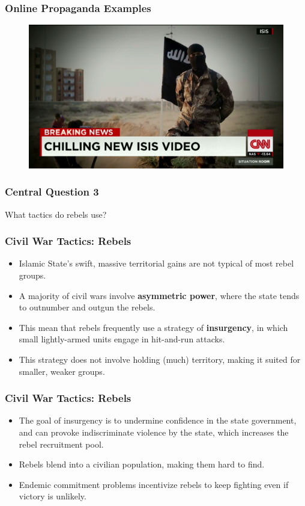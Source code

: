 \documentclass[handout]{beamer}
\begin{document}
\begin{frame} 
	\frametitle{\LARGE{Online Propaganda Examples}}
	\begin{figure}[ht!]
		\centering
		\includegraphics[width=\textwidth,height=0.9\textheight,keepaspectratio]{ISISprop2.jpg}
	\end{figure}
\end{frame}

\begin{frame} 
	\frametitle{\LARGE{Central Question 3}}
	\centering
	\Large{What tactics do rebels use?} 
\end{frame}

\begin{frame} 
	\frametitle{\LARGE{Civil War Tactics: Rebels}}
	\begin{itemize}
		\item Islamic State's swift, massive territorial gains are not typical of most rebel groups.
		\item A majority of civil wars involve \textbf{asymmetric power}, where the state tends to outnumber and outgun the rebels. \pause 
		\item This mean that rebels frequently use a strategy of \textbf{insurgency}, in which small lightly-armed units engage in hit-and-run attacks. \pause 
		\item This strategy does not involve holding (much) territory, making it suited for smaller, weaker groups.  
	\end{itemize}
\end{frame}

\begin{frame} 
	\frametitle{\LARGE{Civil War Tactics: Rebels}}
	\begin{itemize}
		\item The goal of insurgency is to undermine confidence in the state government, and can provoke indiscriminate violence by the state, which increases the rebel recruitment pool. \pause
		\item Rebels blend into a civilian population, making them hard to find. \pause
		\item Endemic commitment problems incentivize rebels to keep fighting even if victory is unlikely.
	\end{itemize}
\end{frame}
\end{document}
